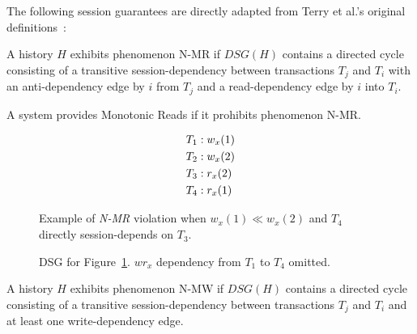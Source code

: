 The following session guarantees are directly adapted from Terry et
al.'s original definitions~\cite{sessionguarantees}:

\begin{definition}
A history $H$ exhibits phenomenon N-MR if $DSG(H)$ contains a directed cycle
consisting of a transitive session-dependency between transactions
$T_j$ and $T_i$ with an anti-dependency edge by $i$ from $T_j$ and a
read-dependency edge by $i$ into $T_i$.
\end{definition}

\begin{definition}
A system provides Monotonic Reads if it prohibits phenomenon N-MR.
\end{definition}


\begin{figure}[H]
\begin{align*}
\small
T_1 &: w_x(1)\\
T_2 &: w_x(2)\\
T_3 &: r_x(2)\\
T_4 &: r_x(1)
\end{align*}
\caption{Example of \textit{N-MR} violation when $w_x(1) \ll w_x(2)$ and $T_4$ directly session-depends on $T_3$.}
\label{fig:nmr-history}
\end{figure}

\begin{figure}[H]
\centering
{}
\caption{DSG for Figure~\ref{fig:nmr-history}. $wr_x$ dependency from $T_1$ to $T_4$ omitted.} 
\label{fig:nmr-dsg}
\end{figure}

\begin{definition}
A history $H$ exhibits phenomenon N-MW if $DSG(H)$ contains a directed cycle
consisting of a transitive session-dependency between transactions
$T_j$ and $T_i$ and at least one write-dependency edge.
\end{definition}


